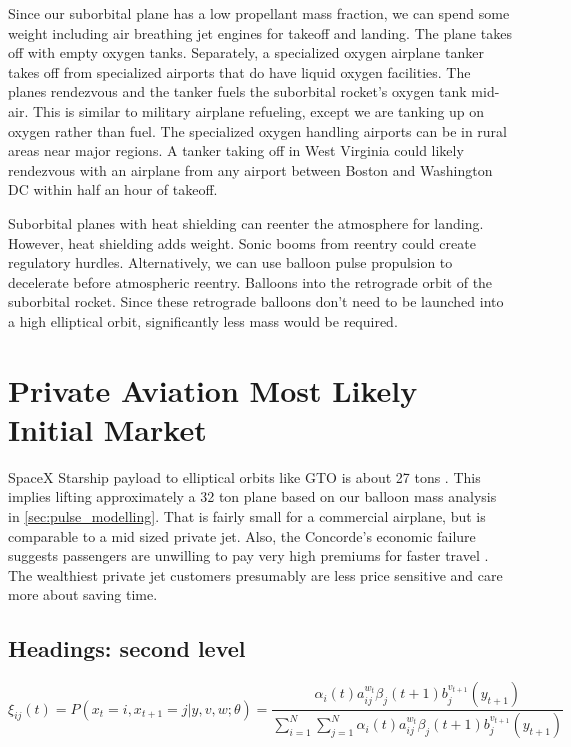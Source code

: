 \documentclass{article}
\begin{document}
Since our suborbital plane has a low propellant mass fraction, we can spend some weight including air breathing jet engines for takeoff and landing.   The plane takes off with empty oxygen tanks.   Separately, a specialized oxygen airplane tanker takes off from specialized airports that do have liquid oxygen facilities.    The planes rendezvous and the tanker fuels the suborbital rocket's oxygen tank mid-air.   This is similar to military airplane refueling, except we are tanking up on oxygen rather than fuel.   The specialized oxygen handling airports can be in rural areas near major regions.   A tanker taking off in West Virginia could likely rendezvous with an airplane from any airport between Boston and Washington DC within half an hour of takeoff.   

Suborbital planes with heat shielding can reenter the atmosphere for landing.   However, heat shielding adds weight.   Sonic booms from reentry could create regulatory hurdles.   Alternatively, we can use balloon pulse propulsion to decelerate before atmospheric reentry.   Balloons into the retrograde orbit of the suborbital rocket.   Since these retrograde balloons don't need to be launched into a high elliptical orbit, significantly less mass would be required.

\section{Private Aviation Most Likely Initial Market}
SpaceX Starship payload to elliptical orbits like GTO is about 27 tons \cite{spacex_user_guide}.   This implies lifting approximately a 32 ton plane based on our balloon mass analysis in \autoref{sec:pulse_modelling}.   That is fairly small for a commercial airplane, but is comparable to a mid sized private jet.   Also, the Concorde's economic failure suggests passengers are unwilling to pay very high premiums for faster travel \cite{concorde_expensive}.  The wealthiest private jet customers presumably are less price sensitive and care more about saving time.



\subsection{Headings: second level}
\lipsum[5]
\begin{equation}
\xi _{ij}(t)=P(x_{t}=i,x_{t+1}=j|y,v,w;\theta)= {\frac {\alpha _{i}(t)a^{w_t}_{ij}\beta _{j}(t+1)b^{v_{t+1}}_{j}(y_{t+1})}{\sum _{i=1}^{N} \sum _{j=1}^{N} \alpha _{i}(t)a^{w_t}_{ij}\beta _{j}(t+1)b^{v_{t+1}}_{j}(y_{t+1})}}
\end{equation}
\end{document}
